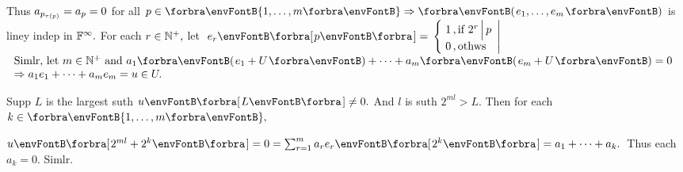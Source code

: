 Thus $a_{p_{\tau(\hspace{0pt}p\hspace{0pt})}}=a_p=0$ for all $p\in\Bra{1,\dots,m}\Rightarrow\Par{e_1,\dots,e_m}$ is liney indep in ${\mathbb{F}}^{\infty}.$\PfEnd\vspace{12pt}\quad
\Or For each $r\in{\mathbb{N}^+},$ let $\;e_r\Sbra{p}={}${\FontSmall$\hMath[0pt]{l}{\left\{\hspace{-2pt}}{\right|}{1\,,\text{if }2^r\,\Big|\,p\\0\,,\text{othws}}$}$\hText{$
	Simlr, let $m\in\Nbp$ and $a_1\Par{e_1+U}+\dots+a_m\Par{e_m+U}=0\\$
	$\Rightarrow a_1e_1+\dots+a_me_m=u\in U.$
	$}$\vspace{3pt}\par\quad
Supp $L$ is the largest suth $u\Sbra{L}\neq 0.$ And $l$ is suth $2^{ml}> L.$ \;Then for each $k\in\Bra{1,\dots,m},$\vspace{2pt}\par\quad
$u\Sbra{2^{ml}+2^k}=0=\sum_{r=1}^m a_re_r\Sbra{2^k}=a_1+\dots+a_k.$ \,Thus each $a_k=0.$ Simlr.\PfEnd
\SepLine
\ChEnd
\pagebreak


\vspace{4pt}


